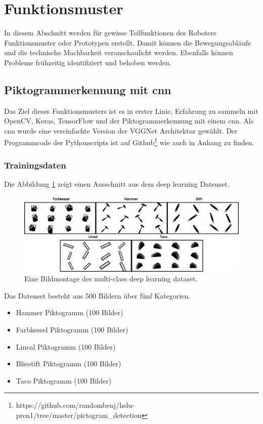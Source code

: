 \newpage
\section{Funktionsmuster}
In diesem Abschnitt werden für gewisse Teilfunktionen des Roboters Funktionsmuster oder Prototypen erstellt. Damit können die Bewegungsabläufe und die technische Machbarkeit veranschaulicht werden. Ebenfalls können Probleme frühzeitig identifiziert und behoben werden.
\subsection{Piktogrammerkennung mit \acrshort{cnn}}
\label{sec:piktogrammerkennung-mit-cnn}
Das Ziel dieses Funktionsmusters ist es in erster Linie, Erfahrung zu sammeln mit OpenCV, Keras, TensorFlow und der Piktogrammerkennung mit einem \acrfull{cnn}. Als \acrshort{cnn} wurde eine vereinfachte Version der VGGNet Architektur gewählt.
Der Programmcode der Pythonscripts ist auf Github\footnote{https://github.com/randombenj/hslu-pren1/tree/master/pictogram\_detection} wie auch in Anhang zu finden.

\subsubsection{Trainingsdaten}
Die Abbildung \ref{fig:deep-learning-dataset} zeigt einen Ausschnitt aus dem deep learning Datenset.

\begin{figure}[H]
  \includegraphics[width=1.0\textwidth]{img/piktogrammerkennung/collage.png}
  \centering
  \caption{Eine Bildmontage des multi-class deep learning dataset.}
  \label{fig:deep-learning-dataset}
\end{figure} 
   
Das Datenset besteht aus 500 Bildern über fünf Kategorien.
\begin{itemize}
    \item Hammer Piktogramm (100 Bilder)
    \item Farbkessel Piktogramm (100 Bilder)
    \item Lineal Piktogramm (100 Bilder)
    \item Bliestift Piktogramm (100 Bilder)
    \item Taco Piktogramm (100 Bilder)
 \end{itemize}
 
